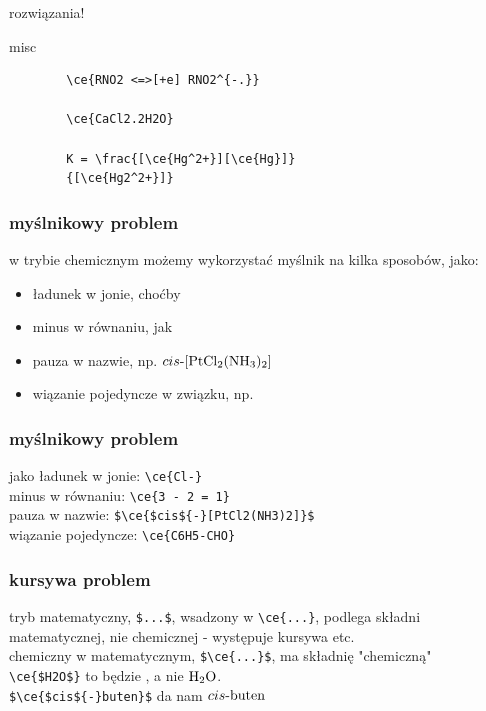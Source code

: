\documentclass{beamer}
\theoremstyle{newblock}
\begin{document}
\begin{frame}[fragile=singleslide]{rozwiązania!}
\begin{exampleblock}{misc}
    \begin{verbatim}
        \ce{RNO2 <=>[+e] RNO2^{-.}}

        \ce{CaCl2.2H2O}

        K = \frac{[\ce{Hg^2+}][\ce{Hg}]}
        {[\ce{Hg2^2+}]}
    \end{verbatim} 
\end{exampleblock}
\end{frame}
\begin{frame}
    \frametitle{myślnikowy problem}
    w trybie chemicznym możemy wykorzystać myślnik na kilka sposobów, jako:
    \begin{itemize}
        \item ładunek w jonie, choćby 
        \item minus w równaniu, jak 
        \item pauza w nazwie, np. $\ce{$cis${-}[PtCl2(NH3)2]}$
        \item wiązanie pojedyncze w związku, np. 
    \end{itemize}
\end{frame}
\begin{frame}[fragile]
    \frametitle{myślnikowy problem}
    jako ładunek w jonie: \verb|\ce{Cl-}| \\ \vspace{1mm}
    minus w równaniu: \verb|\ce{3 - 2 = 1}| \\\vspace{1mm}
    pauza w nazwie: \verb|$\ce{$cis${-}[PtCl2(NH3)2]}$| \\\vspace{1mm}
    wiązanie pojedyncze: \verb|\ce{C6H5-CHO}|
    \\ \vspace{5mm}
\end{frame}
\begin{frame}[fragile]
    \frametitle{kursywa problem}
 tryb matematyczny, \verb|$...$|, wsadzony w \verb|\ce{...}|, podlega składni matematycznej, nie chemicznej - występuje kursywa etc. \\ chemiczny w matematycznym, \verb|$\ce{...}$|, ma składnię "chemiczną" \\ \vspace{3mm}
    \verb|\ce{$H2O$}| to będzie , a nie   $\ce{H2O}$.\\ \vspace{1mm}
    \verb|$\ce{$cis${-}buten}$| da nam $\ce{$cis${-}buten}$
\end{frame}
\end{document}
